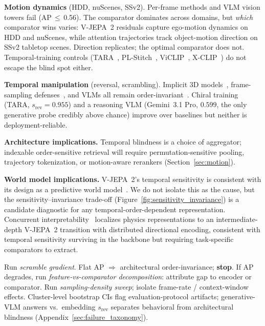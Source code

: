 \documentclass{article}
\theoremstyle{remark}
\begin{document}
\textbf{Motion dynamics} (HDD, nuScenes, SSv2). Per-frame methods and VLM vision towers fail (AP\,$\leq$\,0.56). The comparator dominates across domains, but \emph{which} comparator wins varies: V-JEPA~2 residuals capture ego-motion dynamics on HDD and nuScenes, while attention trajectories track object-motion direction on SSv2 tabletop scenes. Direction replicates; the optimal comparator does not. Temporal-training controls (TARA~\cite{tara}, PL-Stitch~\cite{plstitch}, ViCLIP~\cite{viclip}, X-CLIP~\cite{xclip}) do not escape the blind spot either.

\textbf{Temporal manipulation} (reversal, scrambling). Implicit 3D models~\cite{3dcsl}, frame-sampling defenses~\cite{fojcik2025}, and VLMs all remain order-invariant~\cite{plstitch, aot}. Chiral training (TARA, $s_\text{rev}\!=\!0.955$) and a reasoning VLM (Gemini~3.1 Pro, $0.599$, the only generative probe credibly above chance) improve over baselines but neither is deployment-reliable.

\textbf{Architecture implications.} Temporal blindness is a choice of aggregator; indexable order-sensitive retrieval will require permutation-sensitive pooling, trajectory tokenization, or motion-aware rerankers (Section~\ref{sec:motion}).

\textbf{World model implications.} V-JEPA~2's temporal sensitivity is consistent with its design as a predictive world model~\cite{lecun_worldmodel,vjepa2}. We do not isolate this as the cause, but the sensitivity--invariance trade-off (Figure~\ref{fig:sensitivity_invariance}) is a candidate diagnostic for any temporal-order-dependent representation. Concurrent interpretability~\cite{joseph2026physics} localizes physics representations to an intermediate-depth V-JEPA~2 transition with distributed directional encoding, consistent with temporal sensitivity surviving in the backbone but requiring task-specific comparators to extract.

\begin{algorithm}[h]
\caption{Temporal Sensitivity Diagnostic Protocol}
\label{alg:decision}
\begin{algorithmic}[1]
\State Run \emph{scramble gradient}. Flat AP $\Rightarrow$ architectural order-invariance; \textbf{stop}.
\State If AP degrades, run \emph{feature-vs-comparator decomposition}: attribute gap to encoder or comparator.
\State Run \emph{sampling-density sweep}; isolate frame-rate / context-window effects.
\State Cluster-level bootstrap CIs flag evaluation-protocol artifacts; generative-VLM answers vs.\ embedding $s_\text{rev}$ separates behavioral from architectural blindness (Appendix~\ref{sec:failure_taxonomy}).
\end{algorithmic}
\end{algorithm}
\end{document}
